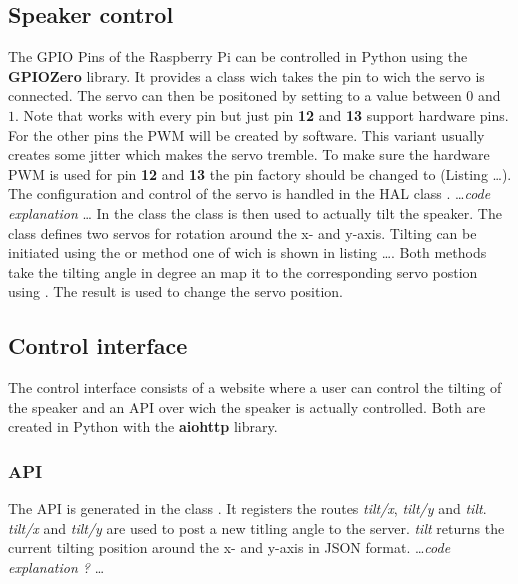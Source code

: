 \subsection{Speaker control}

The GPIO Pins of the Raspberry Pi can be controlled in Python using the \textbf{GPIOZero} library. It provides a class  wich takes the pin to wich the servo is connected. The servo can then be positoned by setting  to a value between $0$ and $1$. Note that  works with every pin but just pin \textbf{12} and \textbf{13} support hardware pins. For the other pins the PWM will be created by software. This variant usually creates some jitter which makes the servo tremble. To make sure the hardware PWM is used for pin \textbf{12} and \textbf{13} the pin factory should be changed to  (Listing \dots).
%
The configuration and control of the servo is handled in the HAL class .\p
\dots \textit{code explanation} \dots\p
%
In the class  the  class is then used to actually tilt the speaker. The class defines two servos for rotation around the x- and y-axis. Tilting can be initiated using the  or  method one of wich is shown in listing \dots. Both methods take the tilting angle in degree an map it to the corresponding servo postion using . The result is used to change the servo position.

\subsection{Control interface}
%
The control interface consists of a website where a user can control the tilting of the speaker and an API over wich the speaker is actually controlled. Both are created in Python with the \textbf{aiohttp} library.

\subsubsection*{API}

The API is generated in the class . It registers the routes \textit{tilt/x}, \textit{tilt/y} and \textit{tilt}.
\textit{tilt/x} and \textit{tilt/y} are used to post a new titling angle to the server. \textit{tilt} returns the current tilting position around the x- and y-axis in JSON format.\p
\dots \textit{code explanation ?} \dots\p

